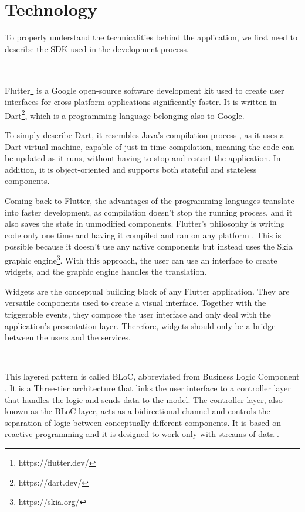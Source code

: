 \section{Technology} \label{3:tech}

To properly understand the technicalities behind the application, we first need to describe the SDK used in the development process.

~

Flutter\footnote{https://flutter.dev/} is a Google open-source software development kit used to create user interfaces for cross-platform applications significantly faster. It is written in Dart\footnote{https://dart.dev/}, which is a programming language belonging also to Google.

To simply describe Dart, it resembles Java’s compilation process \cite{adl1998fast}, as it uses a Dart virtual machine, capable of just in time compilation, meaning the code can be updated as it runs, without having to stop and restart the application. In addition, it is object-oriented and supports both stateful and stateless components. 

Coming back to Flutter, the advantages of the programming languages translate into faster development, as compilation doesn’t stop the running process, and it also saves the state in unmodified components.
Flutter’s philosophy is writing code only one time and having it compiled and ran on any platform \cite{kuzmin2020experience}. This is possible because it doesn’t use any native components but instead uses the Skia graphic engine\footnote{https://skia.org/}. With this approach, the user can use an interface to create widgets, and the graphic engine handles the translation. 

Widgets are the conceptual building block of any Flutter application. They are versatile components used to create a visual interface. Together with the triggerable events, they compose the user interface and only deal with the application’s presentation layer. Therefore, widgets should only be a bridge between the users and the services.

~

This layered pattern is called BLoC, abbreviated from Business Logic Component \cite{flutter2020introduction}. It is a Three-tier architecture \cite{ibm2020arhi} that links the user interface to a controller layer that handles the logic and sends data to the model. 
The controller layer, also known as the BLoC layer, acts as a bidirectional channel and controls the separation of logic between conceptually different components. It is based on reactive programming and it is designed to work only with streams of data \cite{flutter2019bloc}. 

